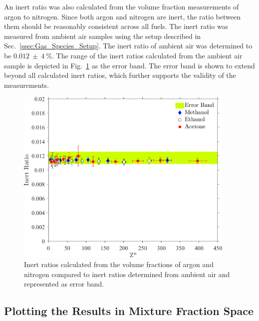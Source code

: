 \documentclass[12pt]{article}
\begin{document}
An inert ratio was also calculated from the volume fraction measurements of argon to nitrogen. Since both argon and nitrogen are inert, the ratio between them should be reasonably consistent across all fuels. The inert ratio was measured from ambient air samples using the setup described in Sec.~\ref{ssec:Gas_Species_Setup}. The inert ratio of ambient air was determined to be $0.012~\pm~4~\%$. The range of the inert ratios calculated from the ambient air sample is depicted in Fig.~\ref{fig:IR} as the error band. The error band is shown to extend beyond all calculated inert ratios, which further supports the validity of the measurements.
\begin{figure}[h!]
	\centering
\includegraphics[width=10.5cm, keepaspectratio]{Inert_ratio_Comparison.png}
	\caption[Stoichiometric Combustion Ratio calculated from experimental values compared to theoretical values]{Inert ratios calculated from the volume fractions of argon and nitrogen compared to inert ratios determined from ambient air and represented as error band.}
	\label{fig:IR}
\end{figure}


\subsection{Plotting the Results in Mixture Fraction Space}
\label{ssec:Mixture_Fraction_Results}
\end{document}
